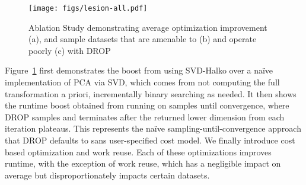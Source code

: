 \begin{figure}
\texttt{[image: figs/lesion-all.pdf]}
\caption[]{Ablation Study demonstrating average optimization improvement (a), and sample datasets that are amenable to (b) and operate poorly (c) with DROP}
\label{fig:lesion}
\end{figure}

Figure~\ref{fig:lesion} first demonstrates the boost from using SVD-Halko over a na\"ive implementation of PCA via SVD, which comes from not computing the full transformation a priori, incrementally binary searching as needed. 
It then shows the runtime boost obtained from running on samples until convergence, where DROP samples and terminates after the returned lower dimension from each iteration plateaus.
This represents the na\"ive sampling-until-convergence approach that DROP defaults to sans user-specified cost model.
We finally introduce cost based optimization and work reuse.
Each of these optimizations improves runtime, with the exception of work reuse, which has a negligible impact on average but disproportionately impacts certain datasets. 

\begin{comment}
\red{On average, DROP is $2.1\times$ faster (up to $41\times$) than PCA via SVD, and $1.6\times$ faster than SVD-Halko (up to $3.3\times$). DROP with cost-based optimization is faster than  sampling to convergence by $1.2\times$ on average, but this default strategy is still $1.4\times$ faster than SVD-Halko on average.}


\begin{comment}
\begin{figure}
\texttt{[image: figs/lesion-rev.pdf]}
\caption[]{Average result of lesion study over the UCR datasets.}
\label{fig:lesion}
\end{figure}

\begin{figure}
\texttt{[image: figs/phoneme-rev.pdf]}
\caption[]{Lesion study of the UCR phoneme, a dataset with high intrinsic dimensionality, meaning sampling to convergence is orders of magnitude slower than a batch SVD. DROP's cost function enables it to terminate in advance, returning a higher dimensional basis to minimize reduce overall compute.}
\label{fig:phoneme_lesion}
\end{figure}

\begin{figure}
\texttt{[image: figs/yoga-rev.pdf]}
\caption[]{Lesion study over the UCR yoga dataset. Work reuse provides a $15\%$ runtime improvement.}
\label{fig:yoga-lesion}
\end{figure}
\end{comment}

